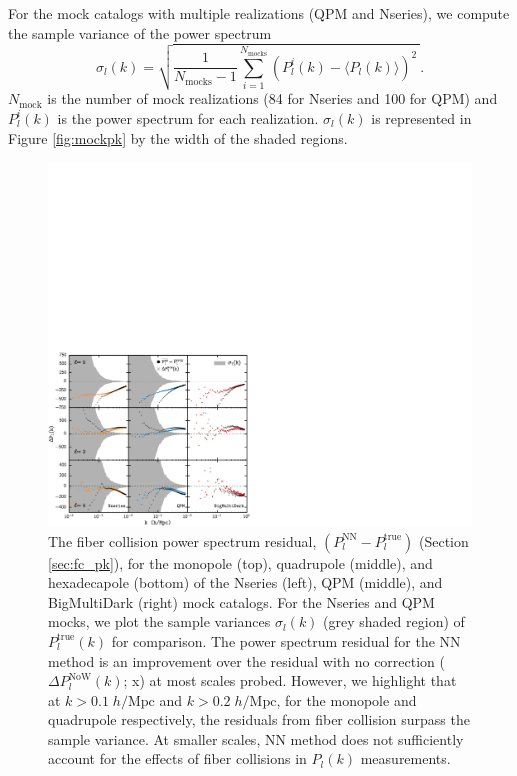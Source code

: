 For the mock catalogs with multiple realizations (QPM and Nseries), we 
compute the sample variance of the power spectrum
\begin{equation} \label{eq:pk_var}
\sigma_l (k)= \sqrt{\frac{1}{N_\mathrm{mocks}-1} \sum\limits_{i=1}^{N_\mathrm{mocks}} (P^i_l(k)- \langle{P_l(k)}\rangle)^2 \ }. 
\end{equation}
$N_\mathrm{mock}$ is the number of mock realizations (84 for Nseries and 100 for 
QPM) and $P^i_l(k)$ is the power spectrum for each realization. $\sigma_l(k)$ is 
represented in Figure \ref{fig:mockpk} by the width of the shaded regions. 
\begin{figure}
\begin{center}
\includegraphics[width=1.\textwidth]{figs/fc/mock_catalog_NN_true_P024k_resid_rebin6x.pdf} 
\caption{The fiber collision power spectrum residual, 
$(P_l^\mathrm{NN}-P_l^\mathrm{true})$ 
(Section \ref{sec:fc_pk}), for the monopole (top), quadrupole 
(middle), and hexadecapole (bottom) of the Nseries (left), QPM (middle), and 
BigMultiDark (right) mock catalogs. For the Nseries and QPM mocks, 
we plot the sample variances $\sigma_l(k)$ (grey shaded region) of 
$P_l^\mathrm{true}(k)$ for comparison. The power spectrum residual for the 
NN method is an improvement over the residual with no correction 
($\Delta P_l^\mathrm{NoW}(k)$; x) at most scales probed. 
However, we highlight that at $k > 0.1 \;h/\mathrm{Mpc}$ and 
$k > 0.2\;h/\mathrm{Mpc}$, for the monopole and quadrupole 
respectively, the residuals from fiber collision surpass the sample 
variance. 
At smaller scales, NN method does not sufficiently account for 
the effects of fiber collisions in $P_l(k)$ measurements.}
\label{fig:fc_pk}
\end{center}
\end{figure}

